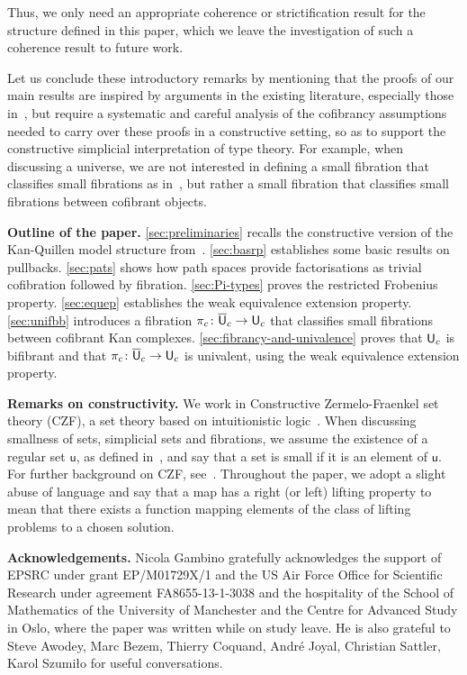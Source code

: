 \documentclass[reqno,10pt,a4paper,oneside,draft]{amsart}
\begin{document}
Thus, we only need an appropriate coherence or strictification result for the structure defined in this paper, 
which we leave the investigation of such a coherence result to future work.

Let us conclude these introductory remarks by mentioning that the proofs of our main results are inspired by arguments  in the existing literature, especially those in~\cite{voevodsky-simplicial-model}, but require a systematic
and careful analysis of the cofibrancy assumptions needed to carry over these proofs in a constructive
setting, so as to support the constructive simplicial interpretation of type theory. For example,
when discussing a universe, we are not interested in defining a small fibration that classifies small fibrations as in~\cite{voevodsky-simplicial-model}, but
rather a small fibration that classifies small fibrations between cofibrant objects. 




\noindent 
\textbf{Outline of the paper.} \cref{sec:preliminaries} recalls the constructive version of the 
Kan-Quillen model structure from~\cite{henry2019qms}. \cref{sec:basrp} establishes some basic results on pullbacks. \cref{sec:pats} shows how path spaces provide factorisations
as trivial cofibration followed by fibration. \cref{sec:Pi-types} proves the restricted Frobenius property. \cref{sec:equep}
establishes the weak equivalence extension property.
\cref{sec:unifbb} introduces a fibration $\pi_c \colon \overline{\mathsf{U}}_c \to \mathsf{U}_c$ that classifies small fibrations
between cofibrant Kan complexes. \cref{sec:fibrancy-and-univalence} proves that $\mathsf{U}_c$ is bifibrant and that $\pi_c \colon \overline{\mathsf{U}}_c \to \mathsf{U}_c$ is univalent, using the weak equivalence extension property.




\noindent
\textbf{Remarks on constructivity.} We work in  Constructive Zermelo-Fraenkel set theory (CZF),
a set theory based on intuitionistic logic~\cite{AczelP:typtic-I}. When discussing smallness of sets,
simplicial sets and fibrations, we assume the existence of a regular set $\mathsf{u}$, as defined 
in~\cite{AczelP:typtic-II}, and say that a set is small if it is an element of $\mathsf{u}$.
For further background on CZF, see~\cite{AczelP:notcst}. 
Throughout the paper, we adopt a slight abuse of language and say that a map has a right (or left) lifting property to mean that there exists a function mapping elements of the class of lifting problems to a chosen solution. 




\noindent 
\textbf{Acknowledgements.} Nicola Gambino gratefully acknowledges the support of
EPSRC under grant EP/M01729X/1 and the US Air Force Office for Scientific Research under 
agreement FA8655-13-1-3038 and the hospitality of the 
School of Mathematics of the University of Manchester and the Centre for Advanced Study in Oslo,
where the paper was written while on study leave. He is also grateful to Steve Awodey, Marc Bezem, Thierry Coquand, Andr\'e Joyal, Christian Sattler, Karol Szumi{\l}o  for useful conversations. 
\end{document}
